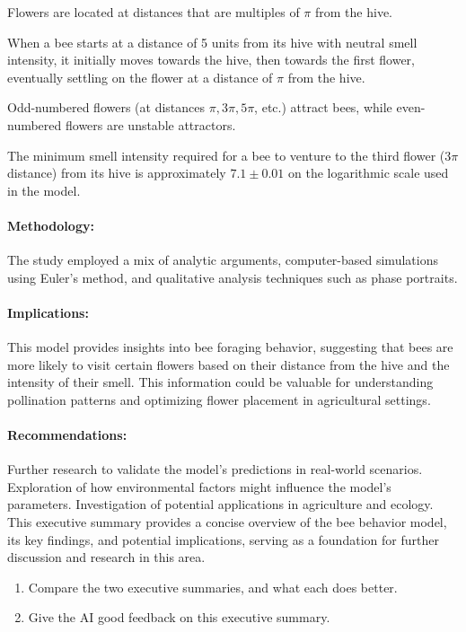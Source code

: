 \begin{enumerate}
{\begin{minipage}{\textwidth}
Flowers are located at distances that are multiples of $\pi$ from the hive.

When a bee starts at a distance of 5 units from its hive with neutral smell intensity, it initially moves towards the hive, then towards the first flower, eventually settling on the flower at a distance of $\pi$ from the hive.

Odd-numbered flowers (at distances $\pi, 3\pi, 5\pi$, etc.) attract bees, while even-numbered flowers are unstable attractors.

The minimum smell intensity required for a bee to venture to the third flower ($3\pi$ distance) from its hive is approximately $7.1 \pm 0.01$ on the logarithmic scale used in the model. \\

\paragraph{Methodology:}
The study employed a mix of analytic arguments, computer-based simulations using Euler's method, and qualitative analysis techniques such as phase portraits.

\paragraph{Implications:}
This model provides insights into bee foraging behavior, suggesting that bees are more likely to visit certain flowers based on their distance from the hive and the intensity of their smell. This information could be valuable for understanding pollination patterns and optimizing flower placement in agricultural settings. \\

\paragraph{Recommendations:}
Further research to validate the model's predictions in real-world scenarios.
Exploration of how environmental factors might influence the model's parameters.
Investigation of potential applications in agriculture and ecology. \\

This executive summary provides a concise overview of the bee behavior model, its key findings, and potential implications, serving as a foundation for further discussion and research in this area. 
\end{minipage}
}

\begin{enumerate}
	\item Compare the two executive summaries, and what each does better.
	\item Give the AI good feedback on this executive summary.
\end{enumerate}



\end{enumerate}






